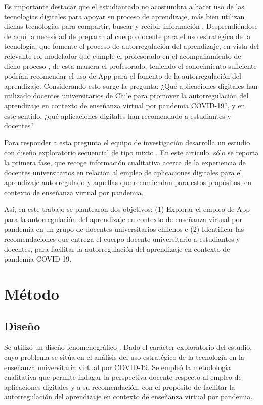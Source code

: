 \documentclass[spanish]{textolivre}
\begin{document}
Es importante destacar que el estudiantado no acostumbra a hacer uso de las tecnologías digitales para apoyar su proceso de aprendizaje, más bien utilizan dichas tecnologías para compartir, buscar y recibir información \cite[p. 71]{marcelo2019}. Desprendiéndose de aquí la necesidad de preparar al cuerpo docente para el uso estratégico de la tecnología, que fomente el proceso de autorregulación del aprendizaje, en vista del relevante rol modelador que cumple el profesorado en el acompañamiento de dicho proceso \cite[p. 90]{diazmujica2017}, de esta manera el profesorado, teniendo el conocimiento suficiente podrían recomendar el uso de App para el fomento de la autorregulación del aprendizaje. Considerando esto surge la pregunta: ¿Qué aplicaciones digitales han utilizado docentes universitarios de Chile para promover la autorregulación del aprendizaje en contexto de enseñanza virtual por pandemia COVID-19?, y en este sentido, ¿qué aplicaciones digitales  han recomendado a estudiantes y docentes?

Para responder a esta pregunta el equipo de investigación desarrolla un estudio con diseño exploratorio secuencial de tipo mixto \cite{creswell2018}. En  este artículo, sólo se reporta la  primera fase, que recoge información cualitativa  acerca de la experiencia de docentes universitarios  en relación al empleo  de  aplicaciones digitales para el aprendizaje autorregulado y  aquellas  que  recomiendan para estos propósitos, en  contexto de enseñanza virtual por pandemia.

Así, en este trabajo se plantearon dos objetivos: (1) Explorar el empleo de App para la autorregulación del aprendizaje en contexto de enseñanza virtual por pandemia en un grupo de  docentes universitarios chilenos e (2) Identificar las recomendaciones que entrega el cuerpo docente universitario a estudiantes y docentes, para facilitar la autorregulación del aprendizaje en contexto de pandemia COVID-19.

\section{Método}
\subsection{Diseño}
Se utilizó un diseño fenomenográfico \cite[p. 189]{marton1981}. Dado el carácter exploratorio del estudio, cuyo problema se sitúa en el análisis del uso  estratégico de la tecnología en la  enseñanza universitaria virtual por COVID-19. Se empleó la metodología cualitativa que permite indagar la perspectiva docente respecto al empleo de aplicaciones digitales y  a su  recomendación, con el propósito de facilitar la autorregulación del aprendizaje en contexto de enseñanza virtual por pandemia.
\end{document}
